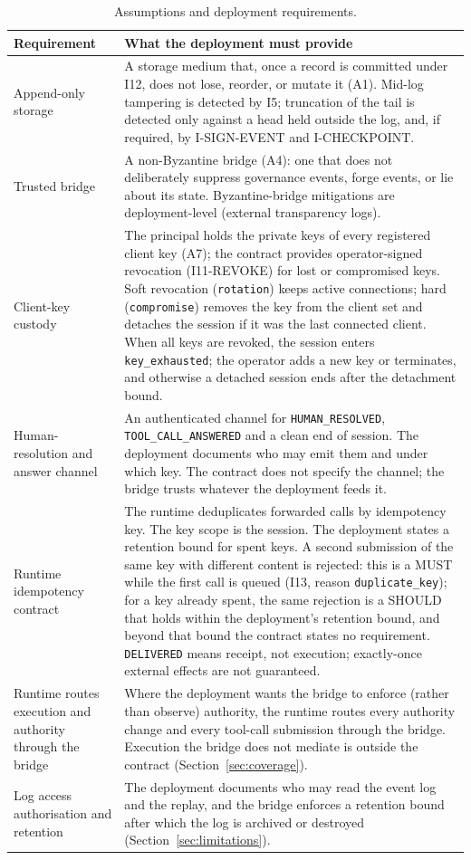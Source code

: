 \begin{table}[htbp]
\centering
\caption{Assumptions and deployment requirements.}
\label{tab:deployment-requirements}
\footnotesize
\begin{tabularx}{\columnwidth}{l X}
\toprule
\textbf{Requirement} & \textbf{What the deployment must provide} \\
\midrule
Append-only storage &
A storage medium that, once a record is committed under I12, does not
lose, reorder, or mutate it (A1). Mid-log tampering is detected by I5;
truncation of the tail is detected only against a head held outside the
log, and, if required, by I-SIGN-EVENT and I-CHECKPOINT. \\
Trusted bridge &
A non-Byzantine bridge (A4): one that does not deliberately suppress
governance events, forge events, or lie about its state. Byzantine-bridge
mitigations are deployment-level (external transparency logs). \\
Client-key custody &
The principal holds the private keys of every registered client key
(A7); the contract provides operator-signed revocation (I11-REVOKE)
for lost or compromised keys. Soft revocation (\texttt{rotation})
keeps active connections; hard (\texttt{compromise}) removes the key
from the client set and detaches the session if it was the last
connected client. When
all keys are revoked, the session enters \texttt{key\_exhausted};
the operator adds a new key or terminates, and otherwise a detached
session ends after the detachment bound. \\
Human-resolution and answer channel &
An authenticated channel for \texttt{HUMAN\_RESOLVED},
\texttt{TOOL\_CALL\_ANSWERED} and a clean end of session. The deployment
documents who may emit them and under which key. The contract does not
specify the channel; the bridge trusts whatever the deployment feeds it. \\
Runtime idempotency contract &
The runtime deduplicates forwarded calls by idempotency key. The key
scope is the session. The deployment states a retention bound for
spent keys. A second submission of the same key with different content
is rejected: this is a MUST while the first call is queued (I13,
reason \texttt{duplicate\_key}); for a key already spent, the same
rejection is a SHOULD that holds within the deployment's retention
bound, and beyond that bound the contract states no requirement.
\texttt{DELIVERED}
means receipt, not execution; exactly-once external effects are not
guaranteed. \\
Runtime routes execution and authority through the bridge &
Where the deployment wants the bridge to enforce (rather than observe)
authority, the runtime routes every authority change and every
tool-call submission through the bridge. Execution the bridge does not
mediate is outside the contract (Section~\ref{sec:coverage}). \\
Log access authorisation and retention &
The deployment documents who may read the event log and the replay, and
the bridge enforces a retention bound after which the log is archived or
destroyed (Section~\ref{sec:limitations}). \\
\bottomrule
\end{tabularx}
\end{table}

